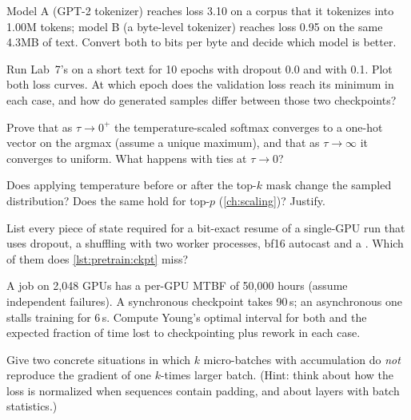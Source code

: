 \begin{exercise}
Model A (GPT-2 tokenizer) reaches loss 3.10 on a corpus that it tokenizes into 1.00M tokens;
model B (a byte-level tokenizer) reaches loss 0.95 on the same 4.3MB of text. Convert both to
bits per byte and decide which model is better.
\end{exercise}

\begin{exercise}
Run Lab~7's  on a short text for 10 epochs with dropout 0.0 and with 0.1.
Plot both loss curves. At which epoch does the validation loss reach its minimum in each case,
and how do generated samples differ between those two checkpoints?
\end{exercise}

\begin{exercise}
Prove that as $\tau\to0^+$ the temperature-scaled softmax converges to a one-hot vector on the
argmax (assume a unique maximum), and that as $\tau\to\infty$ it converges to uniform. What
happens with ties at $\tau\to0$?
\end{exercise}

\begin{exercise}
Does applying temperature before or after the top-$k$ mask change the sampled distribution?
Does the same hold for top-$p$ (\cref{ch:scaling})? Justify.
\end{exercise}

\begin{exercise}
List every piece of state required for a bit-exact resume of a single-GPU run that uses
dropout, a shuffling  with two worker processes, bf16 autocast and a
. Which of them does \cref{lst:pretrain:ckpt} miss?
\end{exercise}

\begin{exercise}
A job on 2{,}048 GPUs has a per-GPU MTBF of 50{,}000 hours (assume independent failures). A
synchronous checkpoint takes 90\,s; an asynchronous one stalls training for 6\,s. Compute
Young's optimal interval for both and the expected fraction of time lost to checkpointing plus
rework in each case.
\end{exercise}

\begin{exercise}
Give two concrete situations in which $k$ micro-batches with accumulation do \emph{not}
reproduce the gradient of one $k$-times larger batch. (Hint: think about how the loss is
normalized when sequences contain padding, and about layers with batch statistics.)
\end{exercise}

